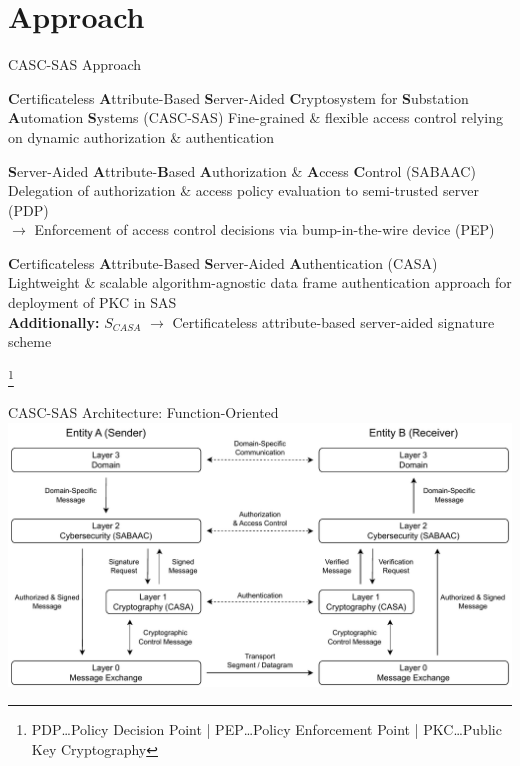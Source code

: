 \documentclass[en]{sdqbeamer}
\newcommand\nonumberfootnote[1]{%
  \begingroup
  \renewcommand\thefootnote{}\footnote{#1}%
  \addtocounter{footnote}{-1}%
  \endgroup
}
\begin{document}
\section{Approach}
\begin{frame}{CASC-SAS Approach}
    \begin{greenblock}{\textbf{C}ertificateless \textbf{A}ttribute-Based \textbf{S}erver-Aided \textbf{C}ryptosystem for \textbf{S}ubstation \textbf{A}utomation \textbf{S}ystems (CASC-SAS)}
        Fine-grained \& flexible access control relying on dynamic authorization \& authentication
    \end{greenblock}
    \begin{blueblock}{\textbf{S}erver-Aided \textbf{A}ttribute-\textbf{B}ased \textbf{A}uthorization \& \textbf{A}ccess \textbf{C}ontrol (SABAAC)}
        Delegation of authorization \& access policy evaluation to semi-trusted server (PDP)
        \\$\rightarrow$ Enforcement of access control decisions via bump-in-the-wire device (PEP)
    \end{blueblock}
    \begin{blueblock}{\textbf{C}ertificateless \textbf{A}ttribute-Based \textbf{S}erver-Aided \textbf{A}uthentication (CASA)}
        Lightweight \& scalable algorithm-agnostic data frame authentication approach for deployment of PKC in SAS
        \\\textbf{Additionally:} $S_{CASA}$ $\rightarrow$ Certificateless attribute-based server-aided signature scheme
    \end{blueblock}
    \nonumberfootnote{PDP\dots Policy Decision Point | PEP\dots Policy Enforcement Point | PKC\dots Public Key Cryptography}
\end{frame}
\begin{frame}{CASC-SAS Architecture: Function-Oriented}
    \centering
    \includegraphics[height=0.75\textheight]{./figures/layers_request_example.drawio.pdf}
\end{frame}
\end{document}
